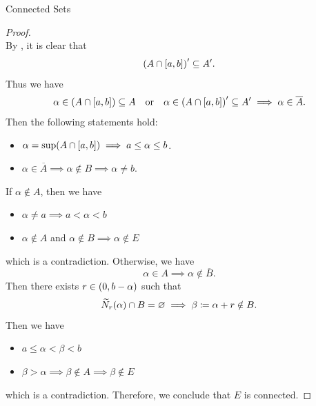 \begin{section}{Connected Sets}
\begin{proof}
\[    \]
    By , it is clear that
    \[
    \paren*{A \cap [a, b]}' \subseteq A'.
    \]
    Thus we have
    \[
    \alpha \in \paren*{A \cap [a, b]} \subseteq A \quad \text{or} \quad
    \alpha \in \paren*{A \cap [a, b]}' \subseteq A' \implies \alpha \in \overline{A}.
    \]
    Then the following statements hold:
    \begin{itemize}
        \item $\alpha = \sup\paren*{A \cap [a, b]} \implies a \leq \alpha \leq b$.
        \item $\alpha \in \overline{A} \implies \alpha \notin B \implies \alpha \neq b$.
    \end{itemize}
    If $\alpha \notin A$, then we have
    \begin{itemize}
        \item $\alpha \neq a \implies a < \alpha < b$
        \item $\alpha \notin A$ and $\alpha \notin B \implies \alpha \notin E$
    \end{itemize}
    which is a contradiction. Otherwise, we have
    \[
    \alpha \in A \implies \alpha \notin \overline{B}.
    \]
    Then there exists $r \in \paren*{0, b - \alpha}$ such that
    \[
    \widetilde{N}_{r}(\alpha) \cap B = \vnot \implies \beta \coloneqq \alpha + r \notin B.
    \]
    Then we have
    \begin{itemize}
        \item $a \leq \alpha < \beta < b$
        \item $\beta > \alpha \implies \beta \notin A \implies \beta \notin E$
    \end{itemize}
    which is a contradiction. Therefore, we conclude that $E$ is connected.
\end{proof}

\end{section}